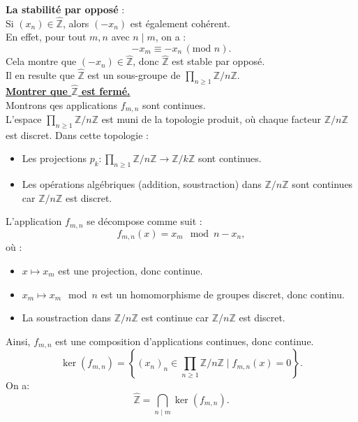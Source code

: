 \documentclass[a4paper, 14pt]{report}
\begin{document}
\begin{onehalfspace}
{			\textbf{La stabilité par opposé} :\\
			Si $(x_n) \in \widehat{\mathbb{Z}}$, alors $(-x_n)$ est également cohérent.\\
			En effet, pour tout $m, n$ avec $n \mid m$, on a :
			\[
			-x_m \equiv -x_n \, (\text{mod } n).
			\]
			Cela montre que $(-x_n) \in \widehat{\mathbb{Z}}$, donc $\widehat{\mathbb{Z}}$ est stable par opposé.\\
			Il en resulte que \( \widehat{\mathbb{Z}} \) est un sous-groupe de \( \prod_{n \geq 1} \mathbb{Z}/n\mathbb{Z} \).\\
			
			
			\textbf{\underline{Montrer que \( \widehat{\mathbb{Z}} \) est fermé.}}\\ 
			
			Montrons qes applications \(f_{m,n}\) sont continues.\\
			L'espace \(\prod_{n \geq 1} \mathbb{Z}/n\mathbb{Z}\) est muni de la topologie produit, où chaque facteur \(\mathbb{Z}/n\mathbb{Z}\) est discret. Dans cette topologie :
			\begin{itemize}
				\item Les projections \(p_k : \prod_{n \geq 1} \mathbb{Z}/n\mathbb{Z} \to \mathbb{Z}/k\mathbb{Z}\) sont continues.
				\item Les opérations algébriques (addition, soustraction) dans \(\mathbb{Z}/n\mathbb{Z}\) sont continues car \(\mathbb{Z}/n\mathbb{Z}\) est discret.
			\end{itemize}
			L'application \(f_{m,n}\) se décompose comme suit :
			\[
			f_{m,n}(x) = x_m \mod n - x_n,
			\]
			où :
			\begin{itemize}
				\item \(x \mapsto x_m\) est une projection, donc continue.
				\item \(x_m \mapsto x_m \mod n\) est un homomorphisme de groupes discret, donc continu.
				\item La soustraction dans \(\mathbb{Z}/n\mathbb{Z}\) est continue car \(\mathbb{Z}/n\mathbb{Z}\) est discret.
			\end{itemize}
			Ainsi, \(f_{m,n}\) est une composition d'applications continues, donc continue.
			\[
			\ker(f_{m,n}) = \left\{  (x_n)_n \in \prod_{n \geq 1} \mathbb{Z}/n\mathbb{Z} \mid f_{m,n}(x) = 0 \right\}.
			\]
			On a:
			\[
			\widehat{\mathbb{Z}} = \bigcap_{n \mid m} \ker(f_{m,n}).
			\]
			
}
\end{onehalfspace}
\end{document}
